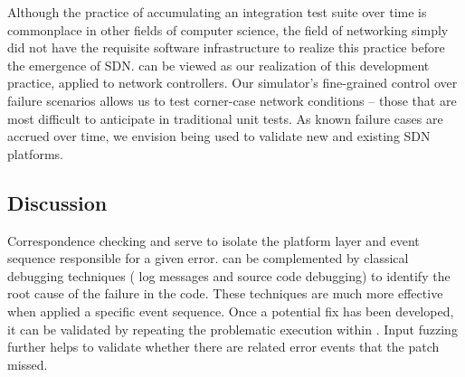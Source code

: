 Although the practice of accumulating an integration test suite over time is
commonplace in other fields of computer science, the field of networking
simply did not have the requisite software infrastructure to realize this practice before the emergence
of SDN. \Simulator{} can be viewed as our realization
of this development practice, applied to network controllers. Our simulator's fine-grained control over
failure scenarios allows us to test corner-case network conditions -- those
that are most difficult to anticipate in traditional unit tests.
As known failure cases are accrued over time, we envision \simulator{} being used to validate
new and existing SDN platforms.

\subsection{Discussion}

Correspondence checking and \simulator{} serve to isolate the platform layer and
event sequence responsible for a given error. \projectname{} can be
complemented by classical debugging techniques (\eg{} log messages and source
code debugging) to identify the root cause of
the failure in the code. These techniques are much more
effective when applied a specific event sequence. Once a
potential fix has been developed, it can be validated by repeating the
problematic execution within \projectname{}. Input fuzzing further helps to
validate whether there are
related error events that the patch missed.

